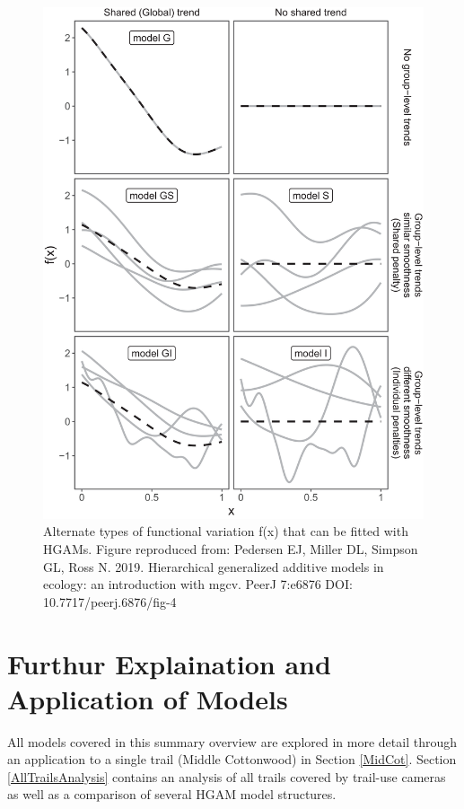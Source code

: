\documentclass[
]{book}
\begin{document}
\begin{figure}
\includegraphics[width=34.72in]{../figures/HGAM} \caption{Alternate types of functional variation f(x) that can be fitted with HGAMs. Figure reproduced from: Pedersen EJ, Miller DL, Simpson GL, Ross N. 2019. Hierarchical generalized additive models in ecology: an introduction with mgcv. PeerJ 7:e6876 DOI: 10.7717/peerj.6876/fig-4}\label{fig:HGAM}
\end{figure}

\hypertarget{furthur-explaination-and-application-of-models}{%
\section{Furthur Explaination and Application of Models}\label{furthur-explaination-and-application-of-models}}

All models covered in this summary overview are explored in more detail
through an application to a single trail (Middle Cottonwood) in Section
\ref{MidCot}. Section \ref{AllTrailsAnalysis} contains an analysis of
all trails covered by trail-use cameras as well as a comparison of
several HGAM model structures.
\end{document}
